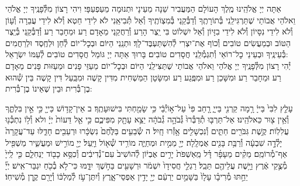 \documentclass[twoside, openany, parskip=half, 11pt]{book}
\begin{document}
אַתָּה יְיָ אֱלֹהֵֽינוּ מֶֽלֶךְ הָעוֹלָם הַמַּעֲבִיר שֵׁנָה מֵעֵינָי וּתְנוּמָה מֵעַפְעַפָּי׃ וִיהִי רָצוֹן מִלְּ֯פָנֶֽיךָ יְיָ אֱלֹהַי וֵאלֹהֵי אֲבוֹתַי שֶׁתַּרְגִּילֵֽנִי בְּ֯תוֹרָתֶֽךָ וְ֯דַבְּ֯קֵֽנִי בְּ֯מִצְוֹתֶֽיךָ וְ֯אַל תְּ֯בִיאֵֽנִי לֹא לִידֵי חֵטְא וְ֯לֹא לִידֵי עֲבֵרָה וְ֯עָוֹן וְ֯לֹא לִידֵי נִסָּיוֹן וְ֯לֹא לִידֵי בִזָּיוֹן וְ֯אַל יִשְׁלוֹט בִּי יֵֽצֶר הָרַע וְ֯רַחֲקֵֽנִי מֵאָדָם רַע וּמֵחָבֵר רַע וְ֯דַבְּ֯קֵֽנִי בְּ֯יֵֽצֶר הַטּוֹב וּבְמַעֲשִׂים טוֹבִים וְ֯כוֹף אֶת־יִצְרִי לְ֯הִשְׁתַּעְבֶּד־לָךְ׃ וּתְנֵֽנִי הַיּוֹם וּבְכׇל־יוֹם לְ֯חֵן וּלְחֶֽסֶד וּלְרַחֲמִים בְּ֯עֵינֶֽיךָ וּבְעֵינֵי כׇל־רוֹאַי וְ֯תִגְמְ֯לֵֽנִי חֲסָדִים טוֹבִים׃ בָּרוּךְ אַתָּה יְיָ גּוֹמֵל חֲסָדִים טוֹבִים לְ֯עַמּוֹ יִשְׂרָאֵל:\\
יְ֯הִי רָצוֹן מִלְּ֯פָנֶֽיךָ יְיָ אֱלֹהַי וֵאלֹהֵי אֲבוֹתַי שֶׁתַּצִּילֵֽנִי הַיּוֹם וּבְכׇל־יוֹם מֵעַזֵּי פָנִים וּמֵעַזּוּת פָּנִים מֵאָדָם רַע וּמֵחָבֵר רַע וּמִשָּׁכֵן רַע וּמִפֶּֽגַע רַע וּמִשָּׂטָן הַמַּשְׁחִית מִדִּין קָשֶׁה וּמִבַּֽעַל דִּין קָשֶׁה בֵּין שְׁ֯הוּא בֶן־בְּ֯רִית וּבֵין שֶׁאֵינוֹ בֶן־בְּ֯רִית:

 
עָלַ֤ץ לִבִּי֙ בַּייָ֔ רָ֥מָה קַרְנִ֖י בַּייָ֑ רָ֤חַב פִּי֙ עַל־א֣וֹיְ֯בַ֔י כִּ֥י שָׂמַ֖חְתִּי בִּישׁוּעָתֶֽךָ׃ ב אֵין־קָד֥וֹשׁ כַּייָ֖ כִּ֣י אֵ֣ין בִּלְתֶּ֑ךָ וְ֯אֵ֥ין צ֖וּר כֵּאלֹהֵֽינוּ׃ אַל־תַּרְבּ֤וּ תְ֯דַבְּ֯רוּ֙ גְּ֯בֹהָ֣ה גְ֯בֹהָ֔ה יֵצֵ֥א עָתָ֖ק מִפִּיכֶ֑ם כִּ֣י אֵ֤ל דֵּעוֹת֙ יְיָ֔ ולא וְ֯ל֥וֹ נִתְכְּ֯נ֖וּ עֲלִלֽוֹת׃ קֶ֥שֶׁת גִּבֹּרִ֖ים חַתִּ֑ים וְ֯נִכְשָׁלִ֖ים אָ֥זְ֯רוּ חָֽיִל׃ ה שְׂ֯בֵעִ֤ים בַּלֶּ֙חֶם֙ נִשְׂכָּ֔רוּ וּרְעֵבִ֖ים חָדֵ֑לּוּ עַד־עֲקָרָה֙ יָלְ֯דָ֣ה שִׁבְעָ֔ה וְ֯רַבַּ֥ת בָּנִ֖ים אֻמְלָֽלָה׃ יְיָ֖ מֵמִ֣ית וּמְחַיֶּ֑ה מוֹרִ֥יד שְׁ֯א֖וֹל וַיָּֽעַל׃ יְיָ֖ מוֹרִ֣ישׁ וּמַעֲשִׁ֑יר מַשְׁפִּ֖יל אַף־מְ֯רוֹמֵֽם׃ מֵקִ֨ים מֵעָפָ֜ר דָּ֗ל מֵֽאַשְׁפֹּת֙ יָרִ֣ים אֶבְי֔וֹן לְ֯הוֹשִׁיב֙ עִם־נְ֯דִיבִ֔ים וְ֯כִסֵּ֥א כָב֖וֹד יַנְחִלֵ֑ם כִּ֤י לַֽייָ֙ מְ֯צֻ֣קֵי אֶ֔רֶץ וַיָּ֥שֶׁת עֲלֵיהֶ֖ם תֵּבֵֽל׃ רַגְלֵ֤י חֲסִידָו֙ יִשְׁמֹ֔ר וּרְשָׁעִ֖ים בַּחֹ֣שֶׁךְ יִדָּ֑מּוּ כִּי־לֹ֥א בְ֯כֹ֖חַ יִגְבַּר־אִֽישׁ׃ יְיָ֞ יֵחַ֣תּוּ מְ֯רִיבָ֗ו עָלָו֙ בַּשָּׁמַ֣יִם יַרְעֵ֔ם יְיָ֖ יָדִ֣ין אַפְסֵי־אָ֑רֶץ וְ֯יִתֶּן־עֹ֣ז לְ֯מַלְכּ֔וֹ וְ֯יָרֵ֖ם קֶ֥רֶן מְ֯שִׁיחֽוֹ׃\\
\end{document}

